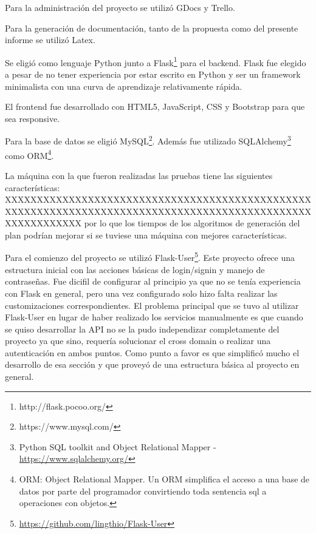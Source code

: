 \documentclass[a4paper]{article}
\begin{document}
Para la administración del proyecto se utilizó GDocs y Trello.\newline

Para la generación de documentación, tanto de la propuesta como del presente informe se utilizó Latex.\newline

Se eligió como lenguaje Python junto a Flask\footnote{http://flask.pocoo.org/} para el backend. Flask fue elegido a pesar de no tener experiencia por estar escrito en Python y ser un framework minimalista con una curva de aprendizaje relativamente rápida.\newline

El frontend fue desarrollado con HTML5, JavaScript, CSS y Bootstrap para que sea responsive.\newline

Para la base de datos se eligió MySQL\footnote{https://www.mysql.com/}. Además fue utilizado SQLAlchemy\footnote{Python SQL toolkit and Object Relational Mapper - \url{https://www.sqlalchemy.org/}} como ORM\footnote{ORM: Object Relational Mapper. Un ORM simplifica el acceso a una base de datos por parte del programador convirtiendo toda sentencia sql a operaciones con objetos.}.\newline

La máquina con la que fueron realizadas las pruebas tiene las siguientes características:
XXXXXXXXXXXXXXXXXXXXXXXXXXXXXXXXXXXXXXXXXXXXXXXXXXXXXXXXXXXXXXXXXXXXXXXXXXXXXXXXXXXXXXXXXXXXXXXXXXXXXXXXXXXX
por lo que los tiempos de los algoritmos de generación del plan podrían mejorar si se tuviese una máquina con mejores características.\newline

Para el comienzo del proyecto se utilizó Flask-User\footnote{\url{https://github.com/lingthio/Flask-User}}. Este proyecto ofrece una estructura inicial con las acciones básicas de login/signin y manejo de contraseñas. Fue dicifil de configurar al principio ya que no se tenía experiencia con Flask en general, pero una vez configurado solo hizo falta realizar las customizaciones correspondientes. El problema principal que se tuvo al utilizar Flask-User en lugar de haber realizado los servicios manualmente es que cuando se quiso desarrollar la API no se la pudo independizar completamente del proyecto ya que sino, requería solucionar el cross domain o realizar una autenticación en ambos puntos. Como punto a favor es que simplificó mucho el desarrollo de esa sección y que proveyó de una estructura básica al proyecto en general.\newline
\end{document}
